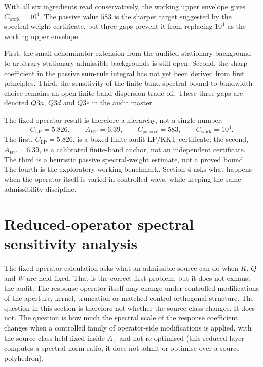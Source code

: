 \documentclass[11pt,a4paper]{article}
\begin{document}
With all six ingredients read conservatively, the working upper envelope gives $C_{\mathrm{work}}=10^{4}$. The passive value $583$ is the sharper target suggested by the spectral-weight certificate, but three gaps prevent it from replacing $10^{4}$ as the working upper envelope.

First, the small-denominator extension from the audited stationary background to arbitrary stationary admissible backgrounds is still open. Second, the sharp coefficient in the passive sum-rule integral has not yet been derived from first principles. Third, the sensitivity of the finite-band spectral bound to bandwidth choice remains an open finite-band dispersion trade-off. These three gaps are denoted $Q3a$, $Q3d$ and $Q3e$ in the audit master.

The fixed-operator result is therefore a hierarchy, not a single number:
\[
C_{\mathrm{LP}}=5.826,
\qquad
A_{\mathrm{HT}}=6.39,
\qquad
C_{\mathrm{passive}}=583,
\qquad
C_{\mathrm{work}}=10^{4}.
\]
The first, $C_{\mathrm{LP}}=5.826$, is a boxed finite-audit LP/KKT certificate; the second, $A_{\mathrm{HT}}=6.39$, is a calibrated finite-band anchor, not an independent certificate. The third is a heuristic passive spectral-weight estimate, not a proved bound. The fourth is the exploratory working benchmark. Section 4 asks what happens when the operator itself is varied in controlled ways, while keeping the same admissibility discipline.

\section{Reduced-operator spectral sensitivity analysis}\label{sec:ladder}

The fixed-operator calculation asks what an admissible source can do when $K$, $Q$ and $W$ are held fixed. That is the correct first problem, but it does not exhaust the audit. The response operator itself may change under controlled modifications of the aperture, kernel, truncation or matched-control-orthogonal structure. The question in this section is therefore not whether the source class changes. It does not. The question is how much the spectral scale of the response coefficient changes when a controlled family of operator-side modifications is applied, with the source class held fixed inside $A_{+}$ and not re-optimised (this reduced layer computes a spectral-norm ratio, it does not admit or optimise over a source polyhedron).
\end{document}

